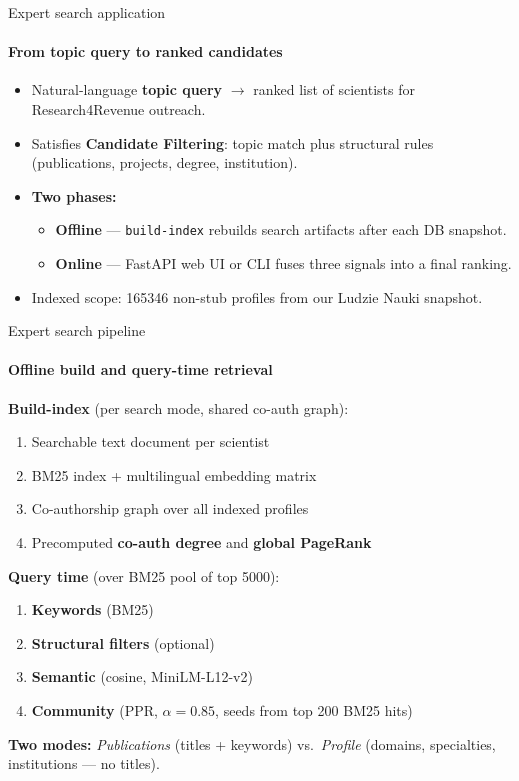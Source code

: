 \documentclass{beamer}
\begin{document}
\begin{frame}{Expert search application}
    \framesubtitle{From topic query to ranked candidates}
    \begin{itemize}
        \item Natural-language \textbf{topic query} $\rightarrow$ ranked list of scientists for Research4Revenue outreach.
        \item Satisfies \textbf{Candidate Filtering}: topic match plus structural rules (publications, projects, degree, institution).
        \item \textbf{Two phases:}
        \begin{itemize}
            \item \textbf{Offline} --- \texttt{build-index} rebuilds search artifacts after each DB snapshot.
            \item \textbf{Online} --- FastAPI web UI or CLI fuses three signals into a final ranking.
        \end{itemize}
        \item Indexed scope: \num{165346} non-stub profiles from our Ludzie Nauki snapshot.
    \end{itemize}
\end{frame}

\begin{frame}{Expert search pipeline}
    \framesubtitle{Offline build and query-time retrieval}
    \small
    \textbf{Build-index} (per search mode, shared co-auth graph):
    \begin{enumerate}
        \item Searchable text document per scientist
        \item BM25 index + multilingual embedding matrix
        \item Co-authorship graph over all indexed profiles
        \item Precomputed \textbf{co-auth degree} and \textbf{global PageRank}
    \end{enumerate}
    \vspace{0.25cm}
    \textbf{Query time} (over BM25 pool of top \num{5000}):
    \begin{enumerate}
        \item \textbf{Keywords} (BM25) \hfill
        \item \textbf{Structural filters} (optional)
        \item \textbf{Semantic} (cosine, MiniLM-L12-v2)
        \item \textbf{Community} (PPR, $\alpha=0.85$, seeds from top \num{200} BM25 hits)
    \end{enumerate}
    \vspace{0.2cm}
    \textbf{Two modes:} \textit{Publications} (titles + keywords) vs.\ \textit{Profile} (domains, specialties, institutions --- no titles).
\end{frame}
\end{document}
